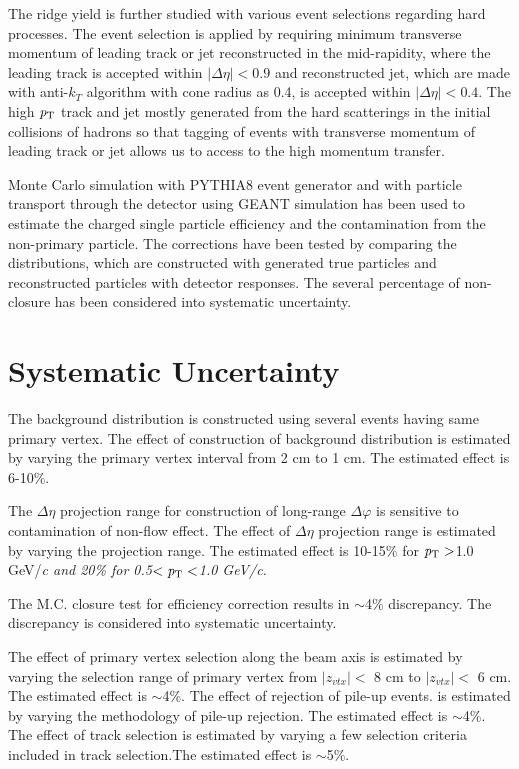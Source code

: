 The ridge yield is further studied with various event selections regarding hard processes. The event selection is applied by requiring minimum transverse momentum of leading track or jet reconstructed in the mid-rapidity, where the leading track is accepted within $|\Delta\eta|<0.9$ and reconstructed jet, which are made with anti-$k_{T}$ algorithm with cone radius as 0.4, is accepted within $|\Delta\eta|<0.4$. The high $\it{p}_{\rm{T}}$ track and jet mostly generated from the hard scatterings in the initial collisions of hadrons so that tagging of events with transverse momentum of leading track or jet allows us to access to the high momentum transfer. 

Monte Carlo simulation with PYTHIA8 event generator and with particle transport through the detector using GEANT simulation has been used to estimate the charged single particle efficiency and the contamination from the non-primary particle. The corrections have been tested by comparing the distributions, which are constructed with generated true particles and reconstructed particles with detector responses. The several percentage of non-closure has been considered into systematic uncertainty.

\section{Systematic Uncertainty}
\label{sec:uncertainties}
The background distribution is constructed using several events having same primary vertex. The effect of construction of background distribution is estimated by varying the primary vertex interval from 2 cm to 1 cm. The estimated effect is 6-10\%.

The $\Delta\eta$ projection range for construction of long-range $\Delta\varphi$ is sensitive to contamination of non-flow effect. The effect of  $\Delta\eta$ projection range is estimated by varying the projection range. The estimated effect is 10-15\% for $\it{p}_{\rm{T}}>$1.0 GeV/\it{c}\rm{} and 20\% for 0.5$<\it{p}_{\rm{T}}<$1.0 GeV/\it{c}\rm{}. 

The M.C. closure test for efficiency correction results in $\sim$4\% discrepancy. The discrepancy is considered into systematic uncertainty.

The effect of primary vertex selection along the beam axis is estimated by varying the selection range of primary vertex from $|z_{vtx}|<$ 8 cm to $|z_{vtx}|<$ 6 cm. The estimated effect is $\sim$4\%. The effect of rejection of pile-up events. is estimated by varying the methodology of pile-up rejection. The estimated effect is $\sim$4\%. The effect of track selection is estimated by varying a few selection criteria included in track selection.The estimated effect is $\sim$5\%. 


